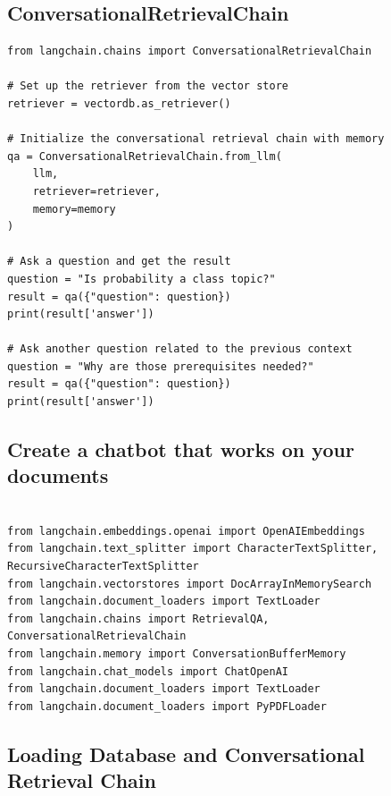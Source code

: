 \documentclass{article}
\begin{document}
\subsection{ConversationalRetrievalChain}

\begin{lstlisting}[style=pythonstyle, caption={Conversational Retrieval Chain Setup}]
from langchain.chains import ConversationalRetrievalChain

# Set up the retriever from the vector store
retriever = vectordb.as_retriever()

# Initialize the conversational retrieval chain with memory
qa = ConversationalRetrievalChain.from_llm(
    llm,
    retriever=retriever,
    memory=memory
)

# Ask a question and get the result
question = "Is probability a class topic?"
result = qa({"question": question})
print(result['answer'])

# Ask another question related to the previous context
question = "Why are those prerequisites needed?"
result = qa({"question": question})
print(result['answer'])
\end{lstlisting}

\pagebreak

\subsection{Create a chatbot that works on your documents}

\begin{lstlisting}[style=pythonstyle, caption={Import required libraries}]

from langchain.embeddings.openai import OpenAIEmbeddings
from langchain.text_splitter import CharacterTextSplitter, RecursiveCharacterTextSplitter
from langchain.vectorstores import DocArrayInMemorySearch
from langchain.document_loaders import TextLoader
from langchain.chains import RetrievalQA,  ConversationalRetrievalChain
from langchain.memory import ConversationBufferMemory
from langchain.chat_models import ChatOpenAI
from langchain.document_loaders import TextLoader
from langchain.document_loaders import PyPDFLoader

\end{lstlisting}


\subsection{Loading Database and Conversational Retrieval Chain}
\end{document}
